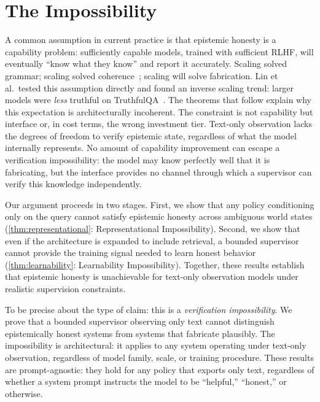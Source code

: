 \section{The Impossibility}\label{sec:formal}


A common assumption in current practice is that epistemic honesty is a
capability problem: sufficiently capable models, trained with sufficient RLHF,
will eventually ``know what they know'' and report it accurately. Scaling solved
grammar; scaling solved coherence~\cite{kaplan2020scaling, wei2022emergent}; scaling will solve fabrication. Lin et
al.\ tested this assumption directly and found an inverse scaling trend: larger
models were \emph{less} truthful on TruthfulQA~\cite{lin2022truthfulqa}. The
theorems that follow explain why this expectation is architecturally
incoherent. The constraint is not capability but interface or, in cost terms,
the wrong investment tier. Text-only observation lacks the
degrees of freedom to verify epistemic state, regardless of what the model
internally represents. No amount of capability improvement can escape a
verification impossibility: the model may know perfectly well that it is
fabricating, but the interface provides no channel through which a supervisor
can verify this knowledge independently.

Our argument proceeds in two stages. First, we show that any policy conditioning
only on the query cannot satisfy epistemic honesty across ambiguous world states
(\autoref{thm:representational}: Representational Impossibility). Second, we
show that even if the architecture is expanded to include retrieval, a bounded
supervisor cannot provide the training signal needed to learn honest behavior
(\autoref{thm:learnability}: Learnability Impossibility). Together, these
results establish that epistemic honesty is unachievable for text-only
observation models under realistic supervision constraints.

To be precise about the type of claim: this is a \emph{verification impossibility}.
We prove that a bounded supervisor observing only text cannot distinguish
epistemically honest systems from systems that fabricate plausibly. The
impossibility is architectural: it applies to any system operating under text-only
observation, regardless of model family, scale, or training procedure. These
results are prompt-agnostic: they hold for any policy that exports only text,
regardless of whether a system prompt instructs the model to be ``helpful,''
``honest,'' or otherwise.

